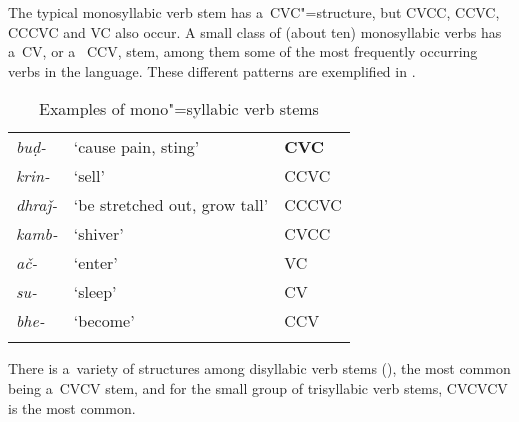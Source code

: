 The typical monosyllabic verb stem has a~CVC"=structure, but CVCC, CCVC, CCCVC and VC also occur. A small class of (about ten) monosyllabic verbs has a~CV, or a ~CCV, stem, among them some of the most frequently occurring verbs in the language. These different patterns are exemplified in . 

\begin{table}[p]
\caption{Examples of mono"=syllabic verb stems}
\begin{tabularx}{\textwidth}{ Q l Q }
\lsptoprule
\textit{buḍ-} &
`cause pain, sting' &
\textbf{CVC}\\
\textit{krin-} &
`sell' &
CCVC\\
\textit{dhraǰ-} &
`be stretched out, grow tall' &
CCCVC\\
\textit{kamb-} &
`shiver' &
CVCC\\
\textit{ač-} &
`enter' &
VC\\
\textit{su-} &
`sleep' &
CV\\
\textit{bhe-} &
`become' &
CCV\\\lspbottomrule
\end{tabularx}
\label{tab:8-mono}
\end{table}

There is a~variety of structures among disyllabic verb stems (), the most common being a~CVCV stem, and for the small group of trisyllabic verb stems, CVCVCV is the most common.

